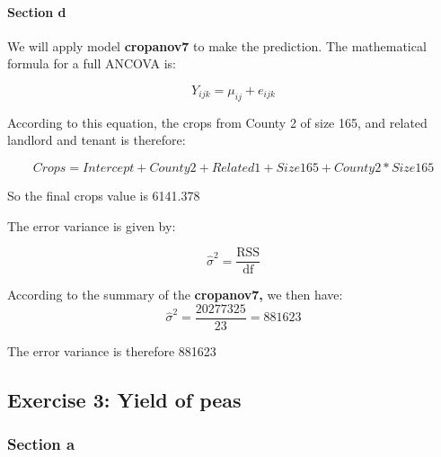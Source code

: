 \documentclass[
]{article}
\begin{document}
\paragraph{Section d}\label{section-d}

We will apply model \textbf{cropanov7} to make the prediction. The
mathematical formula for a full ANCOVA is:

\[ Y_{ijk} = \mu_{ij} + e_{ijk} \]

According to this equation, the crops from County 2 of size 165, and
related landlord and tenant is therefore:

\[
Crops = Intercept + County2 + Related1 + Size 165 + County2*Size165
\]

So the final crops value is 6141.378

The error variance is given by:

\[
\hat{\sigma}^2 = \frac{\text{RSS}}{\text{df}}
\]

According to the summary of the \textbf{cropanov7,} we then have:\[
\hat{\sigma}^2 = \frac{20277325}{23} = 881623
\]

The error variance is therefore 881623

\subsection{Exercise 3: Yield of peas}\label{exercise-3-yield-of-peas}

\subsubsection{Section a}\label{section-a-1}
\end{document}

